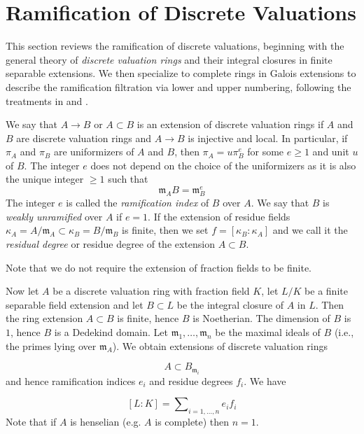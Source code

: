 \section{Ramification of Discrete Valuations}\label{section:ramification_of_discrete_valuations}
This section reviews the ramification of discrete valuations, beginning with the general theory of \textit{discrete valuation rings} and their
integral closures in finite separable extensions.
We then specialize to complete rings in Galois extensions to describe the ramification filtration via lower and upper numbering,
following the treatments in  and \cite{serreLF}.

\begin{definition}[\stackstag{09E4}]\label{definition:weakly_unramified_and_tamely_ramified_DVR}
    We say that $A \to B$ or $A \subset B$ is an extension of discrete valuation rings if $A$ and $B$ are discrete valuation rings and $A \to B$ is injective and local. In particular, if $\pi _ A$ and $\pi _ B$ are uniformizers of $A$ and $B$, then $\pi _ A = u \pi _ B^ e$ for some $e \geq 1$ and unit $u$ of $B$. The integer $e$ does not depend on the choice of the uniformizers as it is also the unique integer $\geq 1$ such that
\[ \mathfrak m_ A B = \mathfrak m_ B^ e \]
The integer $e$ is called the \textit{ramification index} of $B$ over $A$. We say that $B$ is \textit{weakly unramified} over $A$ if $e = 1$.
If the extension of residue fields $\kappa _ A = A/\mathfrak m_ A \subset \kappa _ B = B/\mathfrak m_ B$ is finite,
then we set $f = [\kappa _ B : \kappa _ A]$ and we call it the \textit{residual degree} or residue degree of the extension $A \subset B$.

Note that we do not require the extension of fraction fields to be finite.
\end{definition}

Now let $A$ be a discrete valuation ring with fraction field $K$, let  $L/K$ be a finite separable field extension and
let $B \subset L$ be the integral closure of $A$ in $L$.
Then the ring extension $A \subset B$ is finite, hence $B$ is Noetherian.
The dimension of $B$ is $1$, hence $B$ is a Dedekind domain.
Let $\mathfrak m_1, \ldots , \mathfrak m_ n$ be the maximal ideals of $B$ (i.e., the primes lying over $\mathfrak m_ A$).
We obtain extensions of discrete valuation rings

\[ A \subset B_{\mathfrak m_ i} \]
and hence ramification indices $e_ i$ and residue degrees $f_ i$. We have

\[ [L : K] = \sum \nolimits _{i = 1, \ldots , n} e_ i f_ i \]
Note that if $A$ is henselian (e.g. $A$ is complete) then $n=1$.

